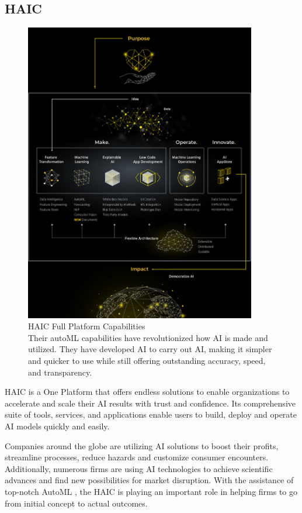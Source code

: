 \documentclass[12pt,a4paper]{report}
\begin{document}
\subsection{\ac{HAIC}}

\begin{figure}[htbp]
\centering
\includegraphics[width=0.9\textwidth]{haic.jpeg}
\caption{\ac{HAIC} Full Platform Capabilities\\ Their autoML capabilities have revolutionized how \ac{AI} is made and utilized. They have developed AI to carry out AI, making it simpler and quicker to use while still offering outstanding accuracy, speed, and transparency.}
\end{figure}

\ac{HAIC} is a One Platform that offers endless solutions to enable organizations to accelerate and scale their AI results with trust and confidence. Its comprehensive suite of tools, services, and applications enable users to build, deploy and operate AI models quickly and easily.

Companies around the globe are utilizing AI solutions to boost their profits, streamline processes, reduce hazards and customize consumer encounters. Additionally, numerous firms are using \ac{AI} technologies to achieve scientific advances and find new possibilities for market disruption. With the assistance of top-notch \ac{AutoML} , the \ac{HAIC} is playing an important role in helping firms to go from initial concept to actual outcomes.
\end{document}
